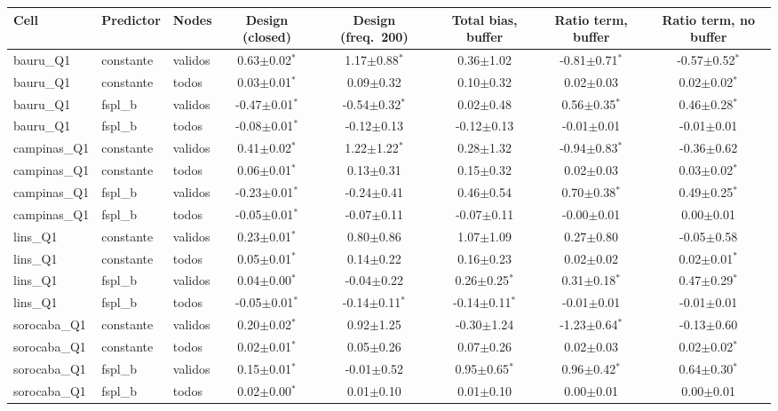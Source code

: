 \begin{tabular}{lllccccc}
\hline
Cell & Predictor & Nodes & Design (closed) & Design (freq.\ 200) & Total bias, buffer & Ratio term, buffer & Ratio term, no buffer \\
\hline
bauru\_Q1 & constante & validos & 0.63$\pm$0.02$^{*}$ & 1.17$\pm$0.88$^{*}$ & 0.36$\pm$1.02 & -0.81$\pm$0.71$^{*}$ & -0.57$\pm$0.52$^{*}$ \\
bauru\_Q1 & constante & todos & 0.03$\pm$0.01$^{*}$ & 0.09$\pm$0.32 & 0.10$\pm$0.32 & 0.02$\pm$0.03 & 0.02$\pm$0.02$^{*}$ \\
bauru\_Q1 & fspl\_b & validos & -0.47$\pm$0.01$^{*}$ & -0.54$\pm$0.32$^{*}$ & 0.02$\pm$0.48 & 0.56$\pm$0.35$^{*}$ & 0.46$\pm$0.28$^{*}$ \\
bauru\_Q1 & fspl\_b & todos & -0.08$\pm$0.01$^{*}$ & -0.12$\pm$0.13 & -0.12$\pm$0.13 & -0.01$\pm$0.01 & -0.01$\pm$0.01 \\
campinas\_Q1 & constante & validos & 0.41$\pm$0.02$^{*}$ & 1.22$\pm$1.22$^{*}$ & 0.28$\pm$1.32 & -0.94$\pm$0.83$^{*}$ & -0.36$\pm$0.62 \\
campinas\_Q1 & constante & todos & 0.06$\pm$0.01$^{*}$ & 0.13$\pm$0.31 & 0.15$\pm$0.32 & 0.02$\pm$0.03 & 0.03$\pm$0.02$^{*}$ \\
campinas\_Q1 & fspl\_b & validos & -0.23$\pm$0.01$^{*}$ & -0.24$\pm$0.41 & 0.46$\pm$0.54 & 0.70$\pm$0.38$^{*}$ & 0.49$\pm$0.25$^{*}$ \\
campinas\_Q1 & fspl\_b & todos & -0.05$\pm$0.01$^{*}$ & -0.07$\pm$0.11 & -0.07$\pm$0.11 & -0.00$\pm$0.01 & 0.00$\pm$0.01 \\
lins\_Q1 & constante & validos & 0.23$\pm$0.01$^{*}$ & 0.80$\pm$0.86 & 1.07$\pm$1.09 & 0.27$\pm$0.80 & -0.05$\pm$0.58 \\
lins\_Q1 & constante & todos & 0.05$\pm$0.01$^{*}$ & 0.14$\pm$0.22 & 0.16$\pm$0.23 & 0.02$\pm$0.02 & 0.02$\pm$0.01$^{*}$ \\
lins\_Q1 & fspl\_b & validos & 0.04$\pm$0.00$^{*}$ & -0.04$\pm$0.22 & 0.26$\pm$0.25$^{*}$ & 0.31$\pm$0.18$^{*}$ & 0.47$\pm$0.29$^{*}$ \\
lins\_Q1 & fspl\_b & todos & -0.05$\pm$0.01$^{*}$ & -0.14$\pm$0.11$^{*}$ & -0.14$\pm$0.11$^{*}$ & -0.01$\pm$0.01 & -0.01$\pm$0.01 \\
sorocaba\_Q1 & constante & validos & 0.20$\pm$0.02$^{*}$ & 0.92$\pm$1.25 & -0.30$\pm$1.24 & -1.23$\pm$0.64$^{*}$ & -0.13$\pm$0.60 \\
sorocaba\_Q1 & constante & todos & 0.02$\pm$0.01$^{*}$ & 0.05$\pm$0.26 & 0.07$\pm$0.26 & 0.02$\pm$0.03 & 0.02$\pm$0.02$^{*}$ \\
sorocaba\_Q1 & fspl\_b & validos & 0.15$\pm$0.01$^{*}$ & -0.01$\pm$0.52 & 0.95$\pm$0.65$^{*}$ & 0.96$\pm$0.42$^{*}$ & 0.64$\pm$0.30$^{*}$ \\
sorocaba\_Q1 & fspl\_b & todos & 0.02$\pm$0.00$^{*}$ & 0.01$\pm$0.10 & 0.01$\pm$0.10 & 0.00$\pm$0.01 & 0.00$\pm$0.01 \\
\hline
\end{tabular}
